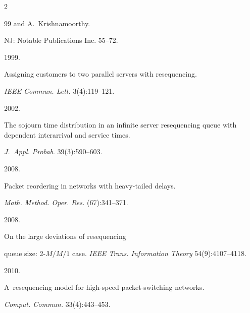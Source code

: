 \begin{multicols}{2}
{{\begin{thebibliography}{99}
and A.~Krishnamoorthy.


 NJ: Notable Publications Inc. 55--72.







 1999. 


Assigning customers to two parallel servers with resequencing.


\textit{IEEE Commun. Lett.} 3(4):119--121.







 2002. 


The sojourn time distribution in an infinite server resequencing queue with dependent interarrival and service times.


\textit{J.~Appl. Probab}. 39(3):590--603.













 2008.


Packet reordering in networks with heavy-tailed delays.


\textit{Math. Method. Oper. Res.} (67):341--371.







 2008.


On the large deviations of resequencing


queue size: 2-$M/M/1$ case. \textit{IEEE Trans. Information Theory} 54(9):4107--4118.










 2010.


A~resequencing model for high-speed packet-switching networks.


\textit{Comput. Commun.} 33(4):443--453.











\end{thebibliography}}}
\end{multicols}
